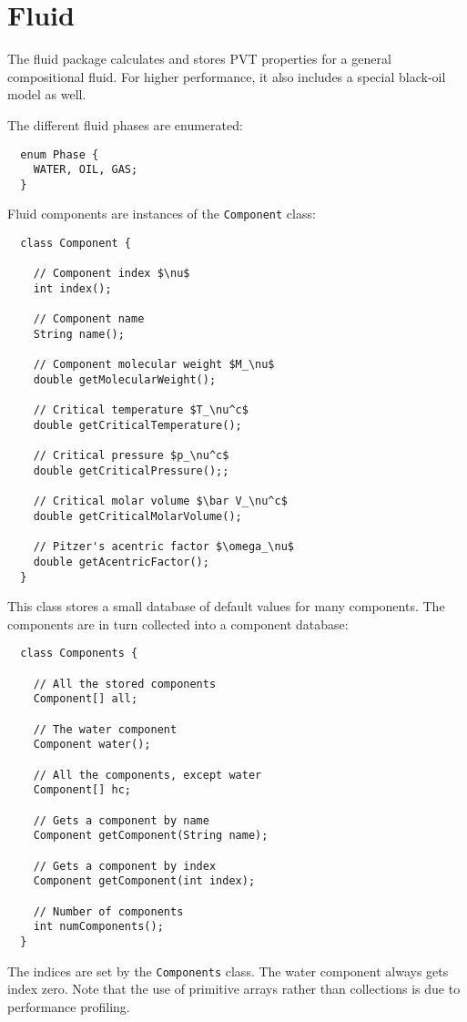 \chapter{Fluid}
\label{chap:fluid}

\minitoc

The fluid package calculates and stores PVT properties for a general
compositional fluid. For higher performance, it also includes a
special black-oil model as well.



The different fluid phases are enumerated:
\begin{lstlisting}
  enum Phase {
    WATER, OIL, GAS;
  }
\end{lstlisting}
Fluid components are instances of the \texttt{Component} class:
\begin{lstlisting}
  class Component {

    // Component index $\nu$
    int index();

    // Component name
    String name();

    // Component molecular weight $M_\nu$
    double getMolecularWeight();

    // Critical temperature $T_\nu^c$
    double getCriticalTemperature();

    // Critical pressure $p_\nu^c$
    double getCriticalPressure();;

    // Critical molar volume $\bar V_\nu^c$
    double getCriticalMolarVolume();

    // Pitzer's acentric factor $\omega_\nu$
    double getAcentricFactor();
  }
\end{lstlisting}
This class stores a small database of default values for many
components. The components are in turn collected into a component
database:
\begin{lstlisting}
  class Components {

    // All the stored components
    Component[] all;

    // The water component
    Component water();

    // All the components, except water
    Component[] hc;

    // Gets a component by name
    Component getComponent(String name);

    // Gets a component by index
    Component getComponent(int index);

    // Number of components
    int numComponents();
  }
\end{lstlisting}
The indices are set by the \texttt{Components} class. The water
component always gets index zero. Note that the use of primitive
arrays rather than collections is due to performance profiling.

